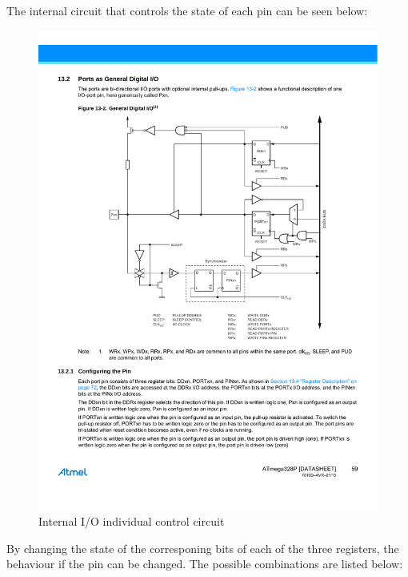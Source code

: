The internal circuit that controls the state of each pin can be seen below:

\begin{figure}[H]
    \centering
    \includegraphics[scale = 0.9]{Graphics/MICROS/Practice 1/ARDUINO/INTERNAL_PIN_SETTING.pdf}
    \caption{Internal I/O individual control circuit~\autocite{ATMEGA328P}}
    \label{fig:I/O_CONTROL}
\end{figure}

By changing the state of the corresponing bits of each of the three registers, the behaviour if the pin can be changed. The possible combinations are listed below:


